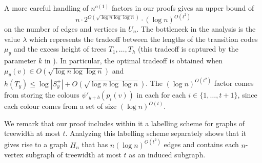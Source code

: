 \documentclass{patmorin}
\begin{document}
A more careful handling of $n^{o(1)}$ factors in our proofs gives an upper bound of
\[
    n\cdot 2^{O(\sqrt{\log n\log\log n})}\cdot (\log n)^{O(t^2)}
\]
on the number of edges and vertices in $U_n$.  The bottleneck in the analysis is the value $\lambda$ which represents the tradeoff between the lengths of the transition codes $\mu_y$ and the excess height of trees $T_1,\ldots,T_h$ (this tradeoff is captured by the parameter $k$ in \cite{dujmovic.esperet.ea:adjacency}).  In particular, the optimal tradeoff is obtained when $\mu_y(v)\in O(\sqrt{\log n\log\log n})$ and $h(T_y)\le \log |S^+_y| + O(\sqrt{\log n\log\log n})$.  The $(\log n)^{O(t^2)}$ factor comes from storing the colours $\psi'_{y+b}(p_i(v))$ in each for each $i\in\{1,\ldots,t+1\}$, since each colour comes from a set of size $(\log n)^{O(t)}$.


We remark that our proof includes within it a labelling scheme for graphs of treewidth at most $t$.  Analyzing this labelling scheme separately shows that it gives rise to a graph $H_n$ that has $n(\log n)^{O(t^2)}$ edges and contains each $n$-vertex subgraph of treewidth at most $t$ as an induced subgraph.



\end{document}
